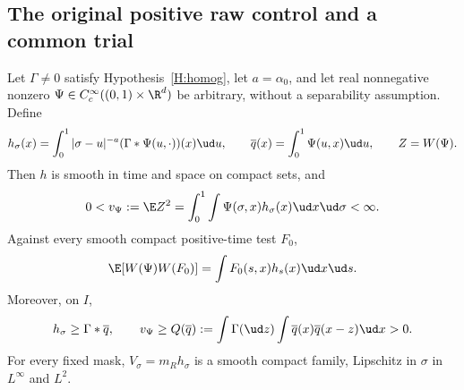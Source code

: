 \subsection{The original positive raw control and a common trial}

\begin{lemma}\label{L:compact-raw-profile}
  Let $\Gamma\ne0$ satisfy Hypothesis~\ref{H:homog}, let $a=\alpha_0$,
  and let real nonnegative nonzero
  $\Psi\in C_c^\infty((0,1)\times\R^d)$ be arbitrary, without a
  separability assumption. Define
  \begin{equation}\label{E:compact-raw-mean}
    h_\sigma(x)=\int_0^1|\sigma-u|^{-a}
    (\Gamma*\Psi(u,\cdot))(x)\ud u,\qquad
    \overline q(x)=\int_0^1\Psi(u,x)\ud u,\qquad Z=W(\Psi).
  \end{equation}
  Then $h$ is smooth in time and space on compact sets, and
  \begin{equation}\label{E:compact-raw-cost}
    0<v_\Psi:=\E Z^2
    =\int_0^1\int\Psi(\sigma,x)h_\sigma(x)\ud x\ud\sigma<\infty.
  \end{equation}
  Against every smooth compact positive-time test $F_0$,
  \[
    \E[W(\Psi)W(F_0)]=\int F_0(s,x)h_s(x)\ud x\ud s.
  \]
  Moreover, on $I$,
  \begin{equation}\label{E:compact-positive-mean-floor}
    h_\sigma\ge\Gamma*\overline q,\qquad
    v_\Psi\ge Q(\overline q)
    :=\int\Gamma(\ud z)\int\overline q(x)\overline q(x-z)\ud x>0.
  \end{equation}
  For every fixed mask, $V_\sigma=m_Rh_\sigma$ is a smooth compact
  family, Lipschitz in $\sigma$ in $L^\infty$ and $L^2$.
\end{lemma}

